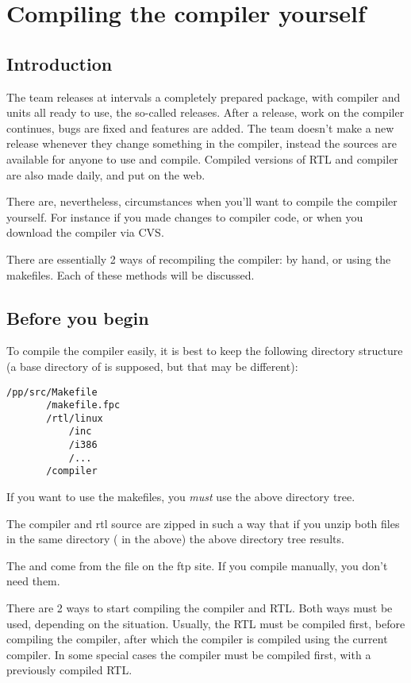 \chapter{Compiling the compiler yourself}
\label{ch:AppF}

\section{Introduction}

The \fpc team releases at intervals a completely prepared package, with
compiler and units all ready to use, the so-called releases.  After a
release, work on the compiler continues, bugs are fixed and features are
added. The \fpc team doesn't make a new release whenever they change
something in the compiler, instead the sources are available for anyone to
use and compile. Compiled versions of RTL and compiler are also made daily,
and put on the web.

There are, nevertheless, circumstances when you'll want to compile the
compiler yourself. For instance if you made changes to compiler code,
or when you download the compiler via CVS.

There are essentially 2 ways of recompiling the compiler: by hand, or using
the makefiles. Each of these methods will be discussed.

\section{Before you begin}

To compile the compiler easily, it is best to keep the following directory
structure (a base directory of  is supposed, but that may be
different):
\begin{verbatim}
/pp/src/Makefile
       /makefile.fpc
       /rtl/linux
           /inc
           /i386
           /...
       /compiler
\end{verbatim}
If you want to use the makefiles, you {\em must} use the above directory
tree.

The compiler and rtl source are zipped in such a way that if you unzip both
files in the same directory ( in the above) the above
directory tree results.

The  and  come from the 
file on the ftp site. If you compile manually, you don't need them.

There are 2 ways to start compiling the compiler and RTL. Both ways must be
used, depending on the situation. Usually, the RTL must be compiled first,
before compiling the compiler, after which the compiler is compiled using
the current compiler. In some special cases the compiler must be compiled
first, with a previously compiled RTL.

